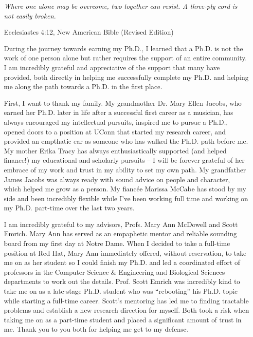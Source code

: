 \begin{acknowledge}
  \epigraph{\textit{Where one alone may be overcome, two together can resist. A three-ply cord is not easily broken.}}{Ecclesiastes 4:12, New American Bible (Revised Edition)}

  During the journey towards earning my Ph.D., I learned that a Ph.D. is not the work of one person alone but rather requires the support of an entire community. I am incredibly grateful and appreciative of the support that many have provided, both directly in helping me successfully complete my Ph.D. and helping me along the path towards a Ph.D. in the first place.

  First, I want to thank my family.  My grandmother Dr. Mary Ellen Jacobs, who earned her Ph.D. later in life after a successful first career as a musician, has always encouraged my intellectual pursuits, inspired me to pursue a Ph.D., opened doors to a position at UConn that started my research career, and provided an empthatic ear as someone who has walked the Ph.D. path before me.  My mother Erika Tracy has always enthusiastically supported (and helped finance!) my educational and scholarly pursuits -- I will be forever grateful of her embrace of my work and trust in my ability to set my own path. My grandfather James Jacobs was always ready with sound advice on people and character, which helped me grow as a person.  My fianc\'{e}e Marissa McCabe has stood by my side and been incredibly flexible while I've been working full time and working on my Ph.D. part-time over the last two years.

  I am incredibly grateful to my advisors, Profs. Mary Ann McDowell and Scott Emrich. Mary Ann  has served as an empaphetic mentor and reliable sounding board from my first day at Notre Dame.  When I decided to take a full-time position at Red Hat, Mary Ann immediately offered, without reservation, to take me on as her student so I could finish my Ph.D. and led a coordinated effort of professors in the Computer Science \& Engineering and Biological Sciences departments to work out the details.   Prof. Scott Emrich was incredibly kind to take me on as a late-stage Ph.D. student who was ``rebooting'' his Ph.D. topic while starting a full-time career.  Scott's mentoring has led me to finding tractable problems and establish a new research direction for myself.  Both took a risk when taking me on as a part-time student and placed a significant amount of trust in me.  Thank you to you both for helping me get to my defense.


\end{acknowledge}
